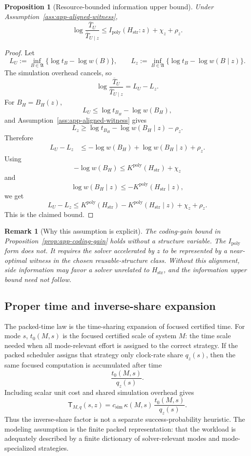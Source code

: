 \documentclass{article}
\newtheorem{proposition}{Proposition}
\newtheorem{remark}{Remark}
\begin{document}
\begin{proposition}[Resource-bounded information upper bound]
\label{prop:app-ipoly-bound}
Under Assumption~\ref{ass:app-aligned-witness},
\[
    \log\frac{\overline T_U}{\overline T_{U\mid z}}
    \le
    I_{\mathrm{poly}}(H_{\mathrm{str}}:z)+\chi_z+\rho_z.
\]
\end{proposition}

\begin{proof}
Let
\[
    L_U:=\inf_{B\in\mathfrak A}\{\log t_B-\log w(B)\},
    \qquad
    L_z:=\inf_{B\in\mathfrak A}\{\log t_B-\log w(B\mid z)\}.
\]
The simulation overhead cancels, so
\[
    \log\frac{\overline T_U}{\overline T_{U\mid z}}
    =
    L_U-L_z.
\]
For \(B_H=B_H(z)\),
\[
    L_U
    \le
    \log t_{B_H}-\log w(B_H),
\]
and Assumption~\ref{ass:app-aligned-witness} gives
\[
    L_z
    \ge
    \log t_{B_H}-\log w(B_H\mid z)-\rho_z.
\]
Therefore
\[
\begin{aligned}
    L_U-L_z
    &\le
    -\log w(B_H)+\log w(B_H\mid z)+\rho_z.
\end{aligned}
\]
Using
\[
    -\log w(B_H)
    \le
    K^{\mathrm{poly}}(H_{\mathrm{str}})+\chi_z
\]
and
\[
    \log w(B_H\mid z)
    \le
    -K^{\mathrm{poly}}(H_{\mathrm{str}}\mid z),
\]
we get
\[
    L_U-L_z
    \le
    K^{\mathrm{poly}}(H_{\mathrm{str}})
    -
    K^{\mathrm{poly}}(H_{\mathrm{str}}\mid z)
    +
    \chi_z+\rho_z.
\]
This is the claimed bound.
\end{proof}

\begin{remark}[Why this assumption is explicit]
The coding-gain bound in Proposition~\ref{prop:app-coding-gain} holds without a structure
variable.  The \(I_{\mathrm{poly}}\) form does not.  It requires the solver accelerated by
\(z\) to be represented by a near-optimal witness in the chosen reusable-structure class.
Without this alignment, side information may favor a solver unrelated to
\(H_{\mathrm{str}}\), and the information upper bound need not follow.
\end{remark}

\subsection{Proper time and inverse-share expansion}
\label{app:proper-time-inverse-share}

The packed-time law is the time-sharing expansion of focused certified time.
For mode \(s\), \(t_0(M,s)\) is the focused certified scale of system \(M\): the time
scale needed when all mode-relevant effort is assigned to the correct strategy.
If the packed scheduler assigns that strategy only clock-rate share \(q_z(s)\), then the
same focused computation is accumulated after time
\[
    \frac{t_0(M,s)}{q_z(s)}.
\]
Including scalar unit cost and shared simulation overhead gives
\[
    \mathsf T_{M,q}(s,z)
    =
    c_{\mathrm{sim}}\,
    \kappa(M,s)\,
    \frac{t_0(M,s)}{q_z(s)}.
\]
Thus the inverse-share factor is not a separate success-probability heuristic.
The modeling assumption is the finite packed representation: that the workload is
adequately described by a finite dictionary of solver-relevant modes and mode-specialized
strategies.
\end{document}
